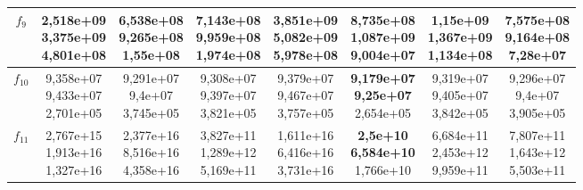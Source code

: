 \begin{table}[t]
\begin{small}
\begin{tabular}{|c|c|c|c|c|c|c|c|}
        $f_9$    & \makecell{2,518e+09 \\ 3,375e+09 \\ 4,801e+08} & \makecell{6,538e+08 \\ 9,265e+08 \\ 1,55e+08}  & \makecell{\textbf{7,143e+08} \\ 9,959e+08 \\ 1,974e+08} & \makecell{3,851e+09 \\ 5,082e+09 \\ 5,978e+08} & \makecell{8,735e+08 \\ 1,087e+09 \\ 9,004e+07} & \makecell{1,15e+09 \\ 1,367e+09 \\ 1,134e+08} & \makecell{7,575e+08 \\ \textbf{9,164e+08} \\ 7,28e+07} \\\hline
        $f_{10}$ & \makecell{9,358e+07 \\ 9,433e+07 \\ 2,701e+05} & \makecell{9,291e+07 \\ 9,4e+07 \\ 3,745e+05}   & \makecell{9,308e+07 \\ 9,397e+07 \\ 3,821e+05} & \makecell{9,379e+07 \\ 9,467e+07 \\ 3,757e+05} & \makecell{\textbf{9,179e+07} \\ \textbf{9,25e+07} \\ 2,654e+05}  & \makecell{9,319e+07 \\ 9,405e+07 \\ 3,842e+05} & \makecell{9,296e+07 \\ 9,4e+07 \\ 3,905e+05}   \\\hline
        $f_{11}$ & \makecell{2,767e+15 \\ 1,913e+16 \\ 1,327e+16} & \makecell{2,377e+16 \\ 8,516e+16 \\ 4,358e+16} & \makecell{3,827e+11 \\ 1,289e+12 \\ 5,169e+11} & \makecell{1,611e+16 \\ 6,416e+16 \\ 3,731e+16} & \makecell{\textbf{2,5e+10} \\ \textbf{6,584e+10} \\ 1,766e+10}   & \makecell{6,684e+11 \\ 2,453e+12 \\ 9,959e+11} & \makecell{7,807e+11 \\ 1,643e+12 \\ 5,503e+11} \\\hline

\end{tabular}
\end{small}
\end{table}
